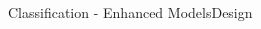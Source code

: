 \documentclass{beamer}
\begin{document}
\begin{frame}{Classification - Enhanced Models}{Design}
\begin{columns}
\begin{column}{0.2\textwidth}
	\end{column}
	\begin{column}{0.55\textwidth}
	\begin{figure}[p]
	\end{figure}	
	\begin{figure}[p]
	\end{figure}	
	\end{column}
\end{columns}	
\end{frame}
\end{document}
